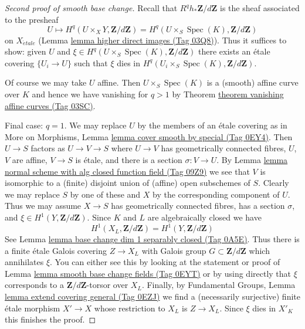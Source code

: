 \documentclass{amsart}
\theoremstyle{plain}
\theoremstyle{definition}
\theoremstyle{remark}
\numberwithin{equation}{subsection}
\def\Spec{\mathop{\mathrm{Spec}}}
\def\etale{{\acute{e}tale}}
\begin{document}
\begin{proof}[Second proof of smooth base change]
\medskip\noindent
Recall that $R^qh_*\mathbf{Z}/d\mathbf{Z}$ is the sheaf associated
to the presheaf
$$
U \longmapsto
H^q(U \times_X Y, \mathbf{Z}/d\mathbf{Z}) =
H^q(U \times_S \Spec(K), \mathbf{Z}/d\mathbf{Z})
$$
on $X_\etale$ (Lemma \href{https://stacks.math.columbia.edu/tag/03Q8}{lemma higher direct images (Tag 03Q8)}).
Thus it suffices to show: given $U$ and
$\xi \in H^q(U \times_S \Spec(K), \mathbf{Z}/d\mathbf{Z})$
there exists an \'etale covering $\{U_i \to U\}$
such that $\xi$ dies in $H^q(U_i \times_S \Spec(K), \mathbf{Z}/d\mathbf{Z})$.

\medskip\noindent
Of course we may take $U$ affine. Then $U \times_S \Spec(K)$
is a (smooth) affine curve over $K$ and hence we have vanishing
for $q > 1$ by Theorem \href{https://stacks.math.columbia.edu/tag/03SC}{theorem vanishing affine curves (Tag 03SC)}.

\medskip\noindent
Final case: $q = 1$. We may replace $U$ by the members of an
\'etale covering as in More on Morphisms, Lemma
\href{https://stacks.math.columbia.edu/tag/0EY4}{lemma cover smooth by special (Tag 0EY4)}.
Then $U \to S$ factors as $U \to V \to S$ where
$U \to V$ has geometrically connected fibres,
$U$, $V$ are affine, $V \to S$ is \'etale, and there is
a section $\sigma : V \to U$. By
Lemma \href{https://stacks.math.columbia.edu/tag/09Z9}{lemma normal scheme with alg closed function field (Tag 09Z9)}
we see that $V$ is isomorphic to a (finite) disjoint union of
(affine) open subschemes of $S$.
Clearly we may replace $S$ by one of these
and $X$ by the corresponding component of $U$.
Thus we may assume $X \to S$ has geometrically connected
fibres, has a section $\sigma$, and
$\xi \in H^1(Y, \mathbf{Z}/d\mathbf{Z})$.
Since $K$ and $L$ are algebraically closed we have
$$
H^1(X_L, \mathbf{Z}/d\mathbf{Z}) =
H^1(Y, \mathbf{Z}/d\mathbf{Z})
$$
See Lemma \href{https://stacks.math.columbia.edu/tag/0A5E}{lemma base change dim 1 separably closed (Tag 0A5E)}.
Thus there is a finite \'etale Galois covering
$Z \to X_L$ with Galois group $G \subset \mathbf{Z}/d\mathbf{Z}$
which annihilates $\xi$.
You can either see this by looking at the statement or
proof of Lemma \href{https://stacks.math.columbia.edu/tag/0EYT}{lemma smooth base change fields (Tag 0EYT)}
or by using directly that $\xi$ corresponds to a
$\mathbf{Z}/d\mathbf{Z}$-torsor over $X_L$.
Finally, by
Fundamental Groups, Lemma \href{https://stacks.math.columbia.edu/tag/0EZJ}{lemma extend covering general (Tag 0EZJ)}
we find a (necessarily surjective)
finite \'etale morphism $X' \to X$
whose restriction to $X_L$ is $Z \to X_L$.
Since $\xi$ dies in $X'_K$ this finishes the proof.
\end{proof}
\end{document}
